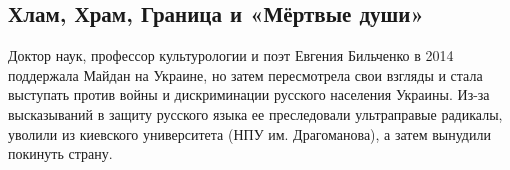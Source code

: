  
 
 
 
 
\subsection{Хлам, Храм, Граница и «Мёртвые души»}
\label{sec:24_11_2021.stz.news.ru.lesmedia.1.bilchenko}


Доктор наук, профессор культурологии и поэт Евгения Бильченко в 2014 поддержала
Майдан на Украине, но затем пересмотрела свои взгляды и стала выступать против
войны и дискриминации русского населения Украины. Из-за высказываний в защиту
русского языка ее преследовали ультраправые радикалы, уволили из киевского
университета (НПУ им. Драгоманова), а затем вынудили покинуть страну. 
